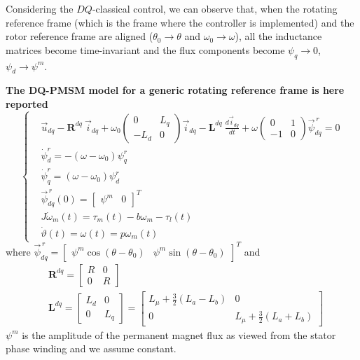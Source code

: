 \documentclass[11pt,a4paper]{article}
\numberwithin{equation}{section}
\theoremstyle{it}
\theoremstyle{definition}
\begin{document}
\begin{onehalfspace}
Considering the $DQ$-classical control, we can observe that, when the rotating reference frame (which is the frame where the controller is implemented) and the rotor reference frame are aligned ($\theta_0 \rightarrow \theta$ and $\omega_0 \rightarrow \omega$), all the inductance matrices become time-invariant and the flux components become $\psi_{q} \rightarrow 0$, $\psi_{d} \rightarrow \psi^m$. 


\begin{mybox}
	\textbf{The DQ-PMSM model for a generic rotating reference frame is here reported}
	\begin{equation}\label{twophase_eq1bis}
		\left\lbrace \begin{aligned}
			& \vec{u}_{dq}-\mathbf{R}^{dq}\ \vec{i}_{dq} + \omega_0\begin{pmatrix} 0 & L_q\\ -L_d & 0 \end{pmatrix}\vec{i}_{dq} - \mathbf{L}^{dq}\ \frac{d\vec{i}_{dq}}{dt} + \omega\begin{pmatrix} 0 & 1\\-1 & 0 \end{pmatrix}\vec{\psi}_{dq}^{\,r} = 0\\[6pt]
			&\dot{\psi}_d^r = -\left( \omega-\omega_0\right)\psi_q^r \\[6pt]
			&\dot{\psi}_q^r = \left( \omega-\omega_0\right)\psi_d^r \\[6pt]
			& \vec{\psi}^{\,r}_{dq}(0) = \begin{bmatrix} \psi^m &  0 \end{bmatrix}^T \\[6pt]
			& J\dot{\omega}_m(t) = \tau_m(t)-b{\omega}_m-\tau_l(t) \\[6pt]
			& \dot{\vartheta}(t) = \omega(t) = p\omega_m(t)
		\end{aligned} \right. 
	\end{equation}
	where $\vec{\psi}^{\,r}_{dq} = \begin{bmatrix} \psi^m\cos(\theta-\theta_0) &  \psi^m\sin(\theta-\theta_0)\end{bmatrix}^T$ and
	\begin{equation*}
		\begin{aligned}
			& \mathbf{R}^{dq} = 
			\begin{bmatrix} R &  0 \\
				0 & R
			\end{bmatrix} \\[6pt]
			& \mathbf{L}^{dq} = 
			\begin{bmatrix} L_d &  0 \\
				0 & L_q
			\end{bmatrix} =
			\begin{bmatrix} L_\mu+\frac{3}{2}(L_a-L_b) &  0 \\
				0 & L_\mu+\frac{3}{2}(L_a+L_b)
			\end{bmatrix}
		\end{aligned} 
	\end{equation*}
	$\psi^m$ is the amplitude of the permanent magnet flux as viewed from the stator phase winding and we assume constant.
\end{mybox}


\end{onehalfspace}
\end{document}
